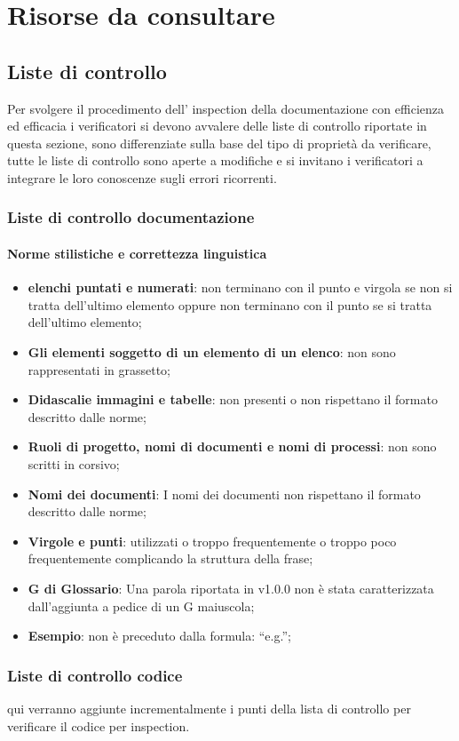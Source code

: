 \section{Risorse da consultare}
    \subsection{Liste di controllo}
        Per svolgere il procedimento dell’ inspection della documentazione con efficienza ed efficacia i verificatori si devono avvalere delle liste di controllo riportate in questa sezione, sono differenziate sulla base del tipo di proprietà da verificare, tutte le liste di controllo sono aperte a modifiche e si invitano i verificatori a integrare le loro conoscenze sugli errori ricorrenti.\\
        \subsubsection{Liste di controllo documentazione}
            \paragraph{Norme stilistiche e correttezza linguistica}
                \begin{itemize}
                    \item\textbf{elenchi puntati e numerati}: non terminano con il punto e virgola se non si tratta dell’ultimo elemento oppure non terminano con il punto se si tratta dell’ultimo elemento;
                    \item\textbf{Gli elementi soggetto di un elemento di un elenco}: non sono rappresentati in grassetto;
                    \item\textbf{Didascalie immagini e tabelle}: non presenti o non rispettano il formato descritto dalle norme;
                    \item\textbf{Ruoli di progetto, nomi di documenti e nomi di processi}: non sono scritti in corsivo;
                    \item\textbf{Nomi dei documenti}: I nomi dei documenti non rispettano il formato descritto dalle norme;
                    \item\textbf{Virgole e punti}: utilizzati o troppo frequentemente o troppo poco frequentemente complicando la struttura della frase;
                    \item\textbf{G di Glossario}: Una parola riportata in  v1.0.0 non è stata caratterizzata dall’aggiunta a pedice di un G maiuscola;
                    \item\textbf{Esempio}: non è preceduto dalla formula: “e.g.”;
                \end{itemize}
                
        \subsubsection{Liste di controllo codice}
            qui verranno aggiunte incrementalmente i punti della lista di controllo per verificare il codice per inspection.
            
